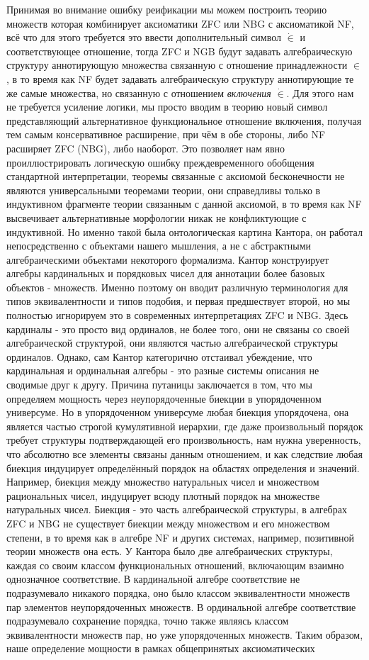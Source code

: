 \documentclass[12pt]{article}
\begin{document}
Принимая во внимание ошибку реификации мы можем построить теорию множеств которая комбинирует аксиоматики ZFC или NBG с аксиоматикой NF, всё что для этого требуется это ввести дополнительный символ $\dot{\in}$ и соответствующее отношение, тогда ZFC и NGB будут задавать алгебраическую структуру аннотирующую множества связанную с отношение принадлежности $\in$, в то время как NF будет задавать алгебраическую структуру аннотирующие те же самые множества, но связанную с отношением {\it включения} $\dot{\in}$. Для этого нам не требуется усиление логики, мы просто вводим в теорию новый символ представляющий альтернативное функциональное отношение включения, получая тем самым консервативное расширение, при чём в обе стороны, либо NF расширяет ZFC (NBG), либо наоборот. Это позволяет нам явно проиллюстрировать логическую ошибку преждевременного обобщения стандартной интерпретации, теоремы связанные с аксиомой бесконечности не являются универсальными теоремами теории, они справедливы только в индуктивном фрагменте теории связанным с данной аксиомой, в то время как NF высвечивает альтернативные морфологии никак не конфликтующие с индуктивной. Но именно такой была онтологическая картина Кантора, он работал непосредственно с объектами нашего мышления, а не с абстрактными алгебраическими объектами некоторого формализма. Кантор конструирует алгебры кардинальных и порядковых чисел для аннотации более базовых объектов - множеств. Именно поэтому он вводит различную терминология для типов эквивалентности и типов подобия, и первая предшествует второй, но мы полностью игнорируем это в современных интерпретациях ZFC и NBG. Здесь кардиналы - это просто вид ординалов, не более того, они не связаны со своей алгебраической структурой, они являются частью алгебраической структуры ординалов. Однако, сам Кантор категорично отстаивал убеждение, что кардинальная и ординальная алгебры - это разные системы описания не сводимые друг к другу. Причина путаницы заключается в том, что мы определяем мощность через неупорядоченные биекции в упорядоченном универсуме. Но в упорядоченном универсуме любая биекция упорядочена, она является частью строгой кумулятивной иерархии, где даже произвольный порядок требует структуры подтверждающей его произвольность, нам нужна уверенность, что абсолютно все элементы связаны данным отношением, и как следствие любая биекция индуцирует определённый порядок на областях определения и значений. Например, биекция между множество натуральных чисел и множеством рациональных чисел, индуцирует всюду плотный порядок на множестве натуральных чисел. Биекция - это часть алгебраической структуры, в алгебрах ZFC и NBG не существует биекции между множеством и его множеством степени, в то время как в алгебре NF и других системах, например, позитивной теории множеств она есть. У Кантора было две алгебраических структуры, каждая со своим классом функциональных отношений, включающим взаимно однозначное соответствие. В кардинальной алгебре соответствие не подразумевало никакого порядка, оно было классом эквивалентности множеств пар элементов неупорядоченных множеств. В ординальной алгебре соответствие подразумевало сохранение порядка, точно также являясь классом эквивалентности множеств пар, но уже упорядоченных множеств. Таким образом, наше определение мощности в рамках общепринятых аксиоматических 
\end{document}
